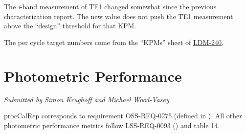 \documentclass[DM,lsstdraft,toc]{lsstdoc}
\begin{document}
The \emph{i}-band measurement of TE1 changed somewhat since the previous characterization report.  The new value does not push the TE1 measurement above the ``design'' threshold for that KPM.

The per cycle target numbers come from the ``KPMs'' sheet of \href{http://ls.st/LDM-240}{LDM-240}.

\section{Photometric Performance}\label{photometric-performance}

\emph{Submitted by Simon Krughoff and Michael Wood-Vasey}

procCalRep corresponds to requirement OSS-REQ-0275 (defined in
). All other photometric performance
metrics follow LSS-REQ-0093 () and
 table 14.
\end{document}
